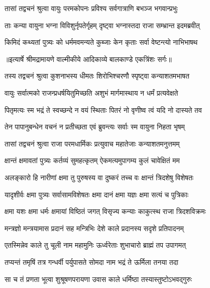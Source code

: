 \twolineshloka
{तासां तद्वचनं श्रुत्वा वायुः परमकोपनः}
{प्रविश्य सर्वगात्राणि बभञ्ज भगवान्प्रभुः} %

\twolineshloka
{ताः कन्या वायुना भग्ना विविशुर्नृपतेर्गृहम्}
{दृष्ट्वा भग्नास्तदा राजा सम्भ्रान्त इदमब्रवीत्} %

\twolineshloka
{किमिदं कथ्यतां पुत्र्यः को धर्ममवमन्यते}
{कुब्जाः केन कृताः सर्वा वेष्टन्त्यो नाभिभाषथ} %


{॥इत्यार्षे श्रीमद्रामायणे वाल्मीकीये आदिकाव्ये बालकाण्डे एकत्रिंशः सर्गः॥}


\twolineshloka
{तस्य तद्वचनं श्रुत्वा कुशनाभस्य धीमतः}
{शिरोभिश्चरणौ स्पृष्ट्वा कन्याशतमभाषत} %

\twolineshloka
{वायुः सर्वात्मको राजन्प्रधर्षयितुमिच्छति}
{अशुभं मार्गमास्थाय न धर्मं प्रत्यवेक्षते} %

\twolineshloka
{पितृमत्यः स्म भद्रं ते स्वच्छन्दे न वयं स्थिताः}
{पितरं नो वृणीष्व त्वं यदि नो दास्यते तव} %

\twolineshloka
{तेन पापानुबन्धेन वचनं न प्रतीच्छता}
{एवं ब्रुवन्त्यः सर्वाः स्म वायुना निहता भृषम्} %

\twolineshloka
{तासां तद्वचनं श्रुत्वा राजा परमधार्मिकः}
{प्रत्युवाच महातेजाः कन्याशतमनुत्तमम्} %

\twolineshloka
{क्षान्तं क्षमावतां पुत्र्यः कर्तव्यं सुमहत्कृतम्}
{ऐकमत्यमुपागम्य कुलं चावेक्षितं मम} %

\twolineshloka
{अलङ्कारो हि नारीणां क्षमा तु पुरुषस्य वा}
{दुष्करं तच्च वः क्षान्तं त्रिदशेषु विशेषतः} %

\twolineshloka
{यादृशीर्वः क्षमा पुत्र्यः सर्वासामविशेषतः}
{क्षमा दानं क्षमा यज्ञः क्षमा सत्यं च पुत्रिकाः} %

\twolineshloka
{क्षमा यशः क्षमा धर्मः क्षमायां विष्ठितं जगत्}
{विसृज्य कन्याः काकुत्स्थ राजा त्रिदशविक्रमः} %

\twolineshloka
{मन्त्रज्ञो मन्त्रयामास प्रदानं सह मन्त्रिभिः}
{देशे काले प्रदानस्य सदृशे प्रतिपादनम्} %

\twolineshloka
{एतस्मिन्नेव काले तु चूली नाम महामुनिः}
{ऊर्ध्वरेताः शुभाचारो ब्राह्मं तप उपागमत्} %

\twolineshloka
{तप्यन्तं तमृषिं तत्र गन्धर्वी पर्युपासते}
{सोमदा नाम भद्रं ते ऊर्मिला तनया तदा} %

\twolineshloka
{सा च तं प्रणता भूत्वा शुश्रूषणपरायणा}
{उवास काले धर्मिष्ठा तस्यास्तुष्टोऽभवद्गुरुः} %


